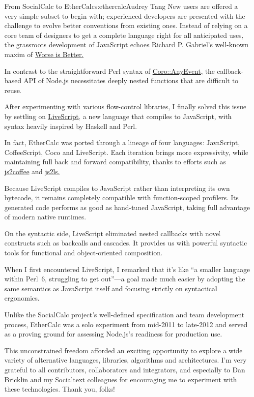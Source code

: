 \begin{aosachapter}{From SocialCalc to EtherCalc}{s:ethercalc}{Audrey Tang}
New users are offered a very simple subset to begin with; experienced
developers are presented with the challenge to evolve better conventions
from existing ones. Instead of relying on a core team of designers to
get a complete language right for all anticipated uses, the grassroots
development of JavaScript echoes Richard P. Gabriel's well-known maxim
of \href{http://www.dreamsongs.com/WorseIsBetter.html}{Worse is Better.}


In contrast to the straightforward Perl syntax of
\href{https://metacpan.org/module/Coro::AnyEvent}{Coro::AnyEvent}, the
callback-based API of Node.js necessitates deeply nested functions that
are difficult to reuse.

After experimenting with various flow-control libraries, I finally
solved this issue by settling on
\href{http://livescript.net/}{LiveScript}, a new language that compiles
to JavaScript, with syntax heavily inspired by Haskell and Perl.

In fact, EtherCalc was ported through a lineage of four languages:
JavaScript, CoffeeScript, Coco and LiveScript. Each iteration brings
more expressivity, while maintaining full back and forward
compatibility, thanks to efforts such as
\href{http://js2coffee.org/}{js2coffee} and
\href{http://js2ls.org/}{js2ls.}

Because LiveScript compiles to JavaScript rather than interpreting its
own bytecode, it remains completely compatible with function-scoped
profilers. Its generated code performs as good as hand-tuned JavaScript,
taking full advantage of modern native runtimes.

On the syntactic side, LiveScript eliminated nested callbacks with novel
constructs such as backcalls and cascades. It provides us with powerful
syntactic tools for functional and object-oriented composition.

When I first encountered LiveScript, I remarked that it's like ``a
smaller language within \mbox{Perl 6}, struggling to get out''---a goal
made much easier by adopting the same semantics as JavaScript itself and
focusing strictly on syntactical ergonomics.


Unlike the SocialCalc project's well-defined specification and team
development process, EtherCalc was a solo experiment from mid-2011 to
late-2012 and served as a proving ground for assessing Node.js's
readiness for production use.

This unconstrained freedom afforded an exciting opportunity to explore a
wide variety of alternative languages, libraries, algorithms and
architectures. I'm very grateful to all contributors, collaborators and
integrators, and especially to Dan Bricklin and my Socialtext colleagues
for encouraging me to experiment with these technologies. Thank you,
folks!

\end{aosachapter}
